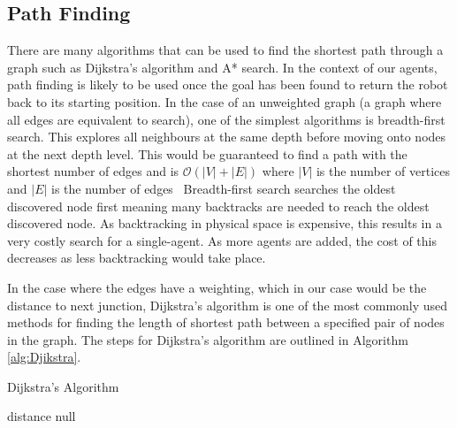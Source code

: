 \subsection{Path Finding}\label{litreview/maze/path}
There are many algorithms that can be used to find the shortest path
through a graph such as Dijkstra's algorithm and A* search. In the
context of our agents, path finding is likely to be used once
the goal has been found to return the robot back to its starting
position. In the case of an unweighted graph (a graph where all edges are
equivalent to search), one of the simplest algorithms
is breadth-first search. This explores all neighbours at the same depth
before moving onto nodes at the next depth level. This would be guaranteed
to find a path with the shortest number of edges and is $\mathcal{O}(|V| + |E|)$
where $|V|$ is the number of vertices and $|E|$ is the number of edges~\cite{cormen2009introduction}
Breadth-first search searches the oldest discovered node first meaning
many backtracks are needed to reach the oldest discovered node. As
backtracking in physical space is expensive, this results in a very
costly search for a single-agent. As more agents are added, the cost of this
decreases as less backtracking would take place.

In the case where the edges have a weighting, which in our case would be the
distance to next junction, Dijkstra's algorithm is one
of the most commonly used methods for finding the length of shortest path between a specified pair of nodes in the graph. The steps for Dijkstra's algorithm are outlined in Algorithm \ref{alg:Djikstra}.

\begin{algorithm}
\caption{Dijkstra's Algorithm}
\label{alg:Djikstra}
\begin{algorithmic}
\ENDFOR
{}
\REPEAT
  	\RETURN distance
  \ENDIF
    \RETURN null
  \ENDIF

    \ENDIF
  \ENDFOR

\end{algorithmic}
\end{algorithm}

